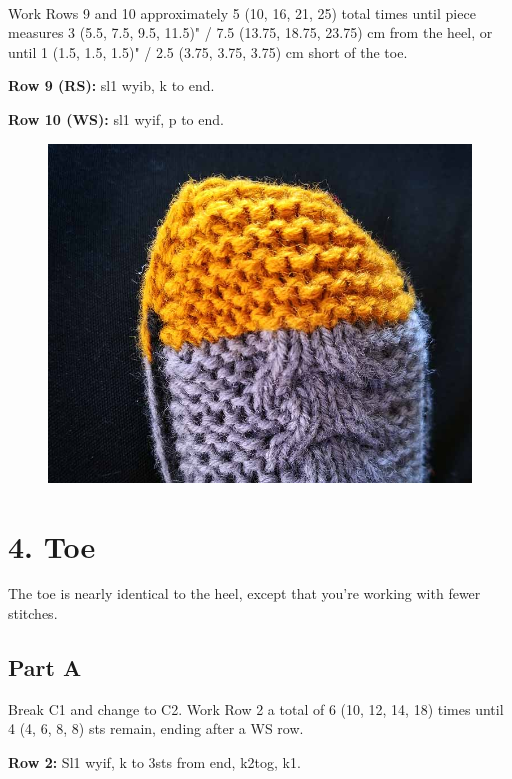 \documentclass[12pt]{article}
\newcommand{\rowDir}[1]{\textbf{#1:}} %
\begin{document}
~\\
Work Rows 9 and 10 approximately 5 (10, 16, 21, 25) total times until piece measures 3 (5.5, 7.5, 9.5, 11.5)" / 7.5 (13.75, 18.75, 23.75) cm from the heel, or until 1 (1.5, 1.5, 1.5)" / 2.5 (3.75, 3.75, 3.75) cm short of the toe.

\rowDir{Row 9 (RS)} sl1 wyib, k to end.

\rowDir{Row 10 (WS)} sl1 wyif, p to end.

\begin{figure}
\vspace{3em}
\includegraphics{Photos/smallVersions/Planetes_toe} \hspace{1em}
\vspace{-6em}
\end{figure} \leavevmode

\section*{4. Toe}

The toe is nearly identical to the heel, except that you're working with fewer stitches.

\subsection*{Part A}
Break C1 and change to C2. Work Row 2 a total of 6 (10, 12, 14, 18) times until 4 (4, 6, 8, 8) sts remain, ending after a WS row.

\rowDir{Row 2} Sl1 wyif, k to 3sts from end, k2tog, k1.
\end{document}
